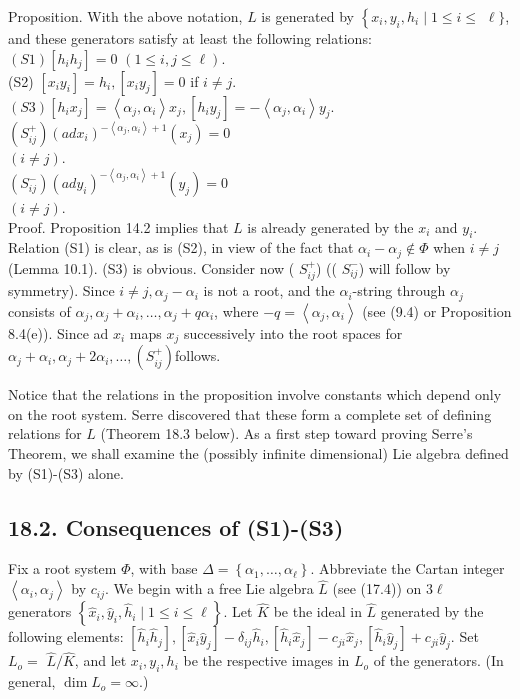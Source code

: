 \documentclass[10pt]{article}
\begin{document}
Proposition. With the above notation, $L$ is generated by $\left\{x_{i}, y_{i}, h_{i} \mid 1 \leq i \leq\right.$ $\ell\}$, and these generators satisfy at least the following relations:\\
$(S 1)\left[h_{i} h_{j}\right]=0$ $(1 \leq i, j \leq \ell)$.\\
(S2) $\left[x_{i} y_{i}\right]=h_{i},\left[x_{i} y_{j}\right]=0$ if $i \neq j$.\\
$(S 3)\left[h_{i} x_{j}\right]=\left\langle\alpha_{j}, \alpha_{i}\right\rangle x_{j},\left[h_{i} y_{j}\right]=-\left\langle\alpha_{j}, \alpha_{i}\right\rangle y_{j}$.\\
$\left(S_{i j}^{+}\right)\left(a d x_{i}\right)^{-\left\langle\alpha_{j}, \alpha_{i}\right\rangle+1}\left(x_{j}\right)=0$\\
$(i \neq j)$.\\
$\left(S_{i j}^{-}\right)\left(a d y_{i}\right)^{-\left\langle\alpha_{j}, \alpha_{i}\right\rangle+1}\left(y_{j}\right)=0$\\
$(i \neq j)$.\\
Proof. Proposition 14.2 implies that $L$ is already generated by the $x_{i}$ and $y_{i}$. Relation (S1) is clear, as is (S2), in view of the fact that $\alpha_{i}-\alpha_{j} \notin \Phi$ when $i \neq j$ (Lemma 10.1). (S3) is obvious. Consider now ( $S_{i j}^{+}$) (( $S_{i j}^{-}$) will follow by symmetry). Since $i \neq j, \alpha_{j}-\alpha_{i}$ is not a root, and the $\alpha_{i}$-string through $\alpha_{j}$ consists of $\alpha_{j}, \alpha_{j}+\alpha_{i}, \ldots, \alpha_{j}+q \alpha_{i}$, where $-q=\left\langle\alpha_{j}, \alpha_{i}\right\rangle$ (see (9.4) or Proposition 8.4(e)). Since ad $x_{i}$ maps $x_{j}$ successively into the root spaces for $\alpha_{j}+\alpha_{i}, \alpha_{j}+2 \alpha_{i}, \ldots,\left(S_{i j}^{+}\right)$follows.

Notice that the relations in the proposition involve constants which depend only on the root system. Serre discovered that these form a complete set of defining relations for $L$ (Theorem 18.3 below). As a first step toward proving Serre's Theorem, we shall examine the (possibly infinite dimensional) Lie algebra defined by (S1)-(S3) alone.

\subsection*{18.2. Consequences of (S1)-(S3)}
Fix a root system $\Phi$, with base $\Delta=\left\{\alpha_{1}, \ldots, \alpha_{\ell}\right\}$. Abbreviate the Cartan integer $\left\langle\alpha_{i}, \alpha_{j}\right\rangle$ by $c_{i j}$. We begin with a free Lie algebra $\hat{L}$ (see (17.4)) on $3 \ell$ generators $\left\{\hat{x}_{i}, \hat{y}_{i}, \hat{h}_{i} \mid 1 \leq i \leq \ell\right\}$. Let $\hat{K}$ be the ideal in $\hat{L}$ generated by the following elements: $\left[\hat{h}_{i} \hat{h}_{j}\right],\left[\hat{x}_{i} \hat{y}_{j}\right]-\delta_{i j} \hat{h}_{i},\left[\hat{h}_{i} \hat{x}_{j}\right]-c_{j i} \hat{x}_{j},\left[\hat{h}_{i} \hat{y}_{j}\right]+c_{j i} \hat{y}_{j}$. Set $L_{o}=$ $\hat{L} / \widehat{K}$, and let $x_{i}, y_{i}, h_{i}$ be the respective images in $L_{o}$ of the generators. (In general, $\operatorname{dim} L_{o}=\infty$.)
\end{document}

